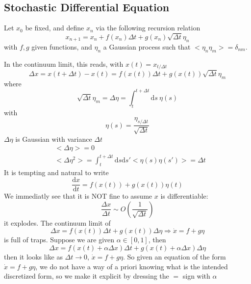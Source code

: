 \documentclass[a4paper]{book}
\theoremstyle{definition}
\theoremstyle{remark}
\begin{document}
\subsection{Stochastic Differential Equation}
Let $x_0$ be fixed, and define $x_n$ via the following recursion relation 
\begin{equation}
    x_{n+1} = x_n + f(x_n)\Delta t + g(x_n)\sqrt{\Delta t} \eta_n
\end{equation}
with $f, g$ given functions, and $\eta_n$ a Gaussian process such that $<\eta_n\eta_m> = \delta_{nm}$. \par \medskip 

In the continuum limit, this reads, with $x(t) = x_{t/\Delta t}$
\begin{equation}
    \Delta x = x(t + \Delta t) - x(t) = f(x(t))\Delta t + g(x(t))\sqrt{\Delta t}\eta_m 
\end{equation}
where 
\begin{equation}
    \sqrt{\Delta t}\eta_m  = \Delta\eta = \int_{t}^{t + \Delta t}\text{d}s~ \eta(s)
\end{equation}
with 
\begin{equation}
    \eta(s) = \frac{\eta_{s/\Delta t}}{\sqrt{\Delta t}}
\end{equation}
$\Delta \eta$ is Gaussian with variance $\Delta t$
\begin{equation}
    \begin{aligned}
        &<\Delta \eta> = 0 \\
        &<\Delta \eta ^2> = \int_{t}^{t+\Delta t} \text{d}s\text{d}s' <\eta(s)\eta(s')> = \Delta t
    \end{aligned}
\end{equation}
It is tempting and natural to write 
\begin{equation}
    \frac{\text{d}x}{\text{d}t} = f(x(t)) + g(x(t))\eta(t)
\end{equation}
We immediatly see that it is NOT fine to assume $x$ is differentiable: 
\begin{equation}
    \frac{\Delta x}{\Delta t} \sim O(\frac{1}{\sqrt{\Delta t}})
\end{equation}
it explodes. The continuum limit of 
\begin{equation}
    \Delta x = f(x(t)) \Delta t + g(x(t)) \Delta \eta \Rightarrow \dot{x} = f + g\eta
\end{equation}
is full of traps. Suppose we are given $\alpha \in [0,1]$, then 
\begin{equation}
    \Delta x = f(x(t) + \alpha \Delta x) \Delta t + g(x(t) + \alpha \Delta x)\Delta \eta
\end{equation}
then it looks like as $\Delta t \rightarrow 0$, $\dot{x} = f + g\eta$. So given an equation of the form $\dot{x} = f + g\eta$, we do not have a way of a priori knowing what is the intended discretized form, so we make it explicit by dressing the $=$ sign with $\alpha$
\end{document}
